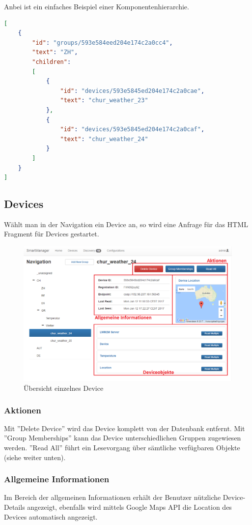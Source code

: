Anbei ist ein einfaches Beispiel einer Komponentenhierarchie.

\begin{lstlisting}[language=json]
[
	{
		"id": "groups/593e584eed204e174c2a0cc4",
		"text": "ZH",
		"children": 
	  	[
		  	{
				"id": "devices/593e5845ed204e174c2a0cae",
				"text": "chur_weather_23"
			},
			{
				"id": "devices/593e5845ed204e174c2a0caf",
				"text": "chur_weather_24"
			}
		]
	}
]
\end{lstlisting}
 \newpage

\subsection{Devices}
Wählt man in der Navigation ein Device an, so wird eine Anfrage für das HTML Fragment für Devices gestartet. 

\begin{figure}[H]
\centering
\includegraphics[scale=0.57]{../04_Realisierung/images/userinterface/devicefragment_collapsed.png}
\caption{Übersicht einzelnes Device}
\end{figure}

\subsubsection{Aktionen}
Mit ''Delete Device'' wird das Device komplett von der Datenbank entfernt. Mit ''Group Memberships'' kann das Device unterschiedlichen Gruppen zugewiesen werden. ''Read All'' führt ein Lesevorgang über sämtliche verfügbaren Objekte (siehe weiter unten).

\subsubsection{Allgemeine Informationen}
Im Bereich der allgemeinen Informationen erhält der Benutzer nützliche Device-Details angezeigt, ebenfalls wird mittels Google Maps API die Location des Devices automatisch angezeigt.

